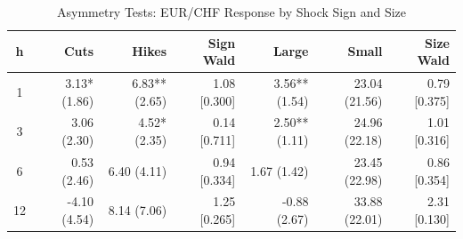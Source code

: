 \begin{table}[ht]
\centering
\caption{Asymmetry Tests: EUR/CHF Response by Shock Sign and Size} 
\label{tab:asymmetry_results}
\begin{tabular}{crrrrrr}
  \toprule
h & Cuts & Hikes & Sign Wald & Large & Small & Size Wald \\ 
  \midrule
  1 & 3.13* (1.86) & 6.83** (2.65) & 1.08 [0.300] & 3.56** (1.54) & 23.04 (21.56) & 0.79 [0.375] \\ 
    3 & 3.06 (2.30) & 4.52* (2.35) & 0.14 [0.711] & 2.50** (1.11) & 24.96 (22.18) & 1.01 [0.316] \\ 
    6 & 0.53 (2.46) & 6.40 (4.11) & 0.94 [0.334] & 1.67 (1.42) & 23.45 (22.98) & 0.86 [0.354] \\ 
   12 & -4.10 (4.54) & 8.14 (7.06) & 1.25 [0.265] & -0.88 (2.67) & 33.88 (22.01) & 2.31 [0.130] \\ 
   \bottomrule
\end{tabular}
\end{table}
